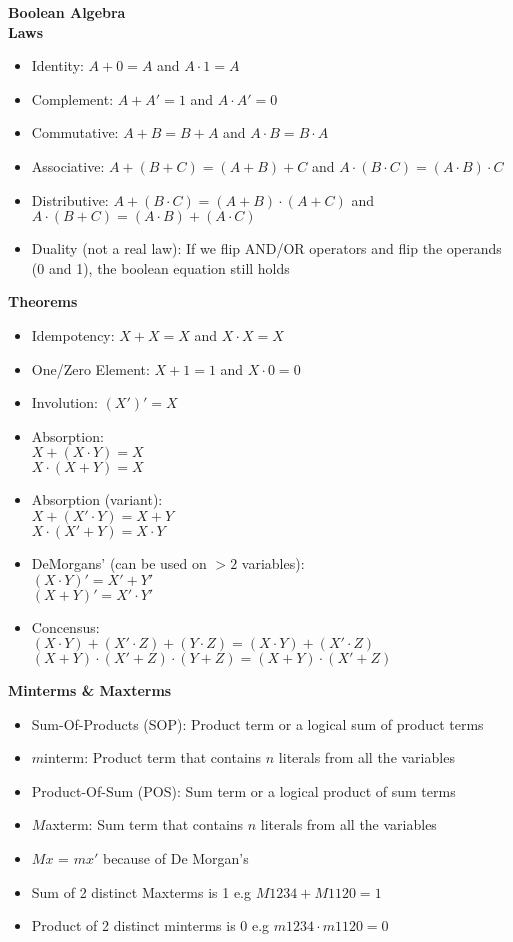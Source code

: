 \documentclass[a4paper]{article} \usepackage[backend=biber, style=numeric, sorting=none]{biblatex}
\begin{document}
\begin{multicols*}{4}
{\small\textbf{Boolean Algebra}}
\\ \textbf{Laws}
\begin{itemize}[leftmargin=*]
\itemsep -0.5em
\item Identity: $A + 0 = A$ and $A \cdot 1 = A$
\item Complement: $A + A' = 1$ and $A \cdot A' = 0$
\item Commutative: $A + B = B + A$  and $A \cdot B = B \cdot A$
\item Associative: $A + (B + C) = (A + B) + C$ and $A \cdot (B \cdot C) = (A \cdot B) \cdot C$
\item Distributive: $A + (B \cdot C) = (A + B) \cdot (A + C)$ and $A \cdot (B + C) = (A \cdot B) + (A \cdot C)$
\item Duality (not a real law): If we flip AND/OR operators and flip the operands (0 and 1), the boolean equation still holds
\end{itemize}

\textbf{Theorems}
\begin{itemize}[leftmargin=*]
\itemsep -0.5em
\item Idempotency: $X + X = X$ and $X \cdot X = X$
\item One/Zero Element: $X + 1 = 1$ and $X \cdot 0 = 0$
\item Involution: $(X')' = X$ 
\item Absorption: \\ $X + (X \cdot Y) = X$ \\ $X \cdot (X + Y) = X$
\item Absorption (variant): \\ $X + (X' \cdot Y) = X + Y$ \\ $X \cdot (X' + Y) = X \cdot Y$
\item DeMorgans' (can be used on $>2$ variables): \\ $(X \cdot Y)' = X' + Y'$ \\ $(X + Y)' = X' \cdot Y'$
\item Concensus: \\ $(X \cdot Y) + (X' \cdot Z) + (Y \cdot Z) = (X \cdot Y) + (X' \cdot Z)$ \\ $(X + Y) \cdot (X' + Z) \cdot (Y + Z) = (X + Y) \cdot (X' + Z)$
\end{itemize}

\textbf{Minterms \& Maxterms}
\begin{itemize}[leftmargin=*]
\itemsep -0.5em
\item Sum-Of-Products (SOP): Product term or a logical sum of product terms
\item $m$interm: Product term that contains $n$ literals from all the variables
\item Product-Of-Sum (POS): Sum term or a logical product of sum terms
\item $M$axterm: Sum term that contains $n$ literals from all the variables
\item $Mx$ = $mx'$ because of De Morgan's
\item Sum of 2 distinct Maxterms is 1 e.g $M1234 + M1120 = 1$
\item Product of 2 distinct minterms is 0 e.g $m1234 \cdot m1120 = 0$
\end{itemize}


\end{multicols*}
\end{document}
